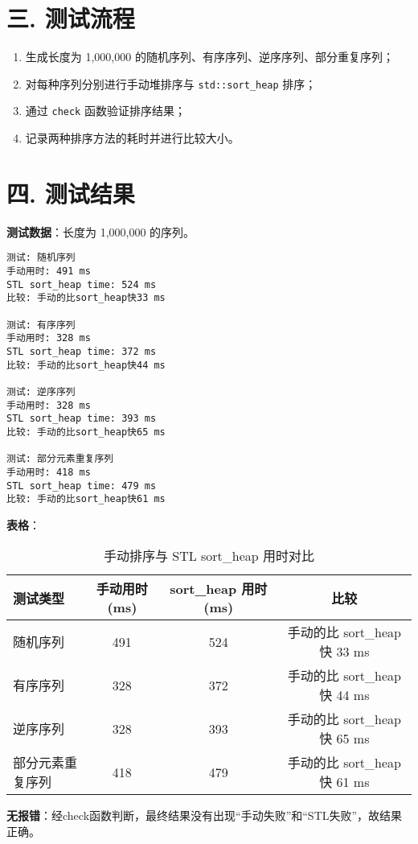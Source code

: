 \documentclass[a4paper]{article}
\begin{document}
\section*{三. 测试流程}

\begin{enumerate}
    \item 生成长度为 1,000,000 的随机序列、有序序列、逆序序列、部分重复序列；
    \item 对每种序列分别进行手动堆排序与 \texttt{std::sort\_heap} 排序；
    \item 通过 \texttt{check} 函数验证排序结果；
    \item 记录两种排序方法的耗时并进行比较大小。
\end{enumerate}

\section*{四. 测试结果}

\noindent \textbf{测试数据}：长度为 1,000,000 的序列。

\begin{verbatim}
测试: 随机序列
手动用时: 491 ms
STL sort_heap time: 524 ms
比较: 手动的比sort_heap快33 ms

测试: 有序序列
手动用时: 328 ms
STL sort_heap time: 372 ms
比较: 手动的比sort_heap快44 ms

测试: 逆序序列
手动用时: 328 ms
STL sort_heap time: 393 ms
比较: 手动的比sort_heap快65 ms

测试: 部分元素重复序列
手动用时: 418 ms
STL sort_heap time: 479 ms
比较: 手动的比sort_heap快61 ms
\end{verbatim}

\textbf{表格}：
\begin{table}[h!]
\centering
\begin{tabular}{@{}lccc@{}}
\toprule
测试类型         & 手动用时 (ms) & sort\_heap 用时 (ms) & 比较 \\ \midrule
随机序列         & 491           & 524                      & 手动的比 sort\_heap 快 33 ms \\
有序序列         & 328           & 372                      & 手动的比 sort\_heap 快 44 ms \\
逆序序列         & 328           & 393                      & 手动的比 sort\_heap 快 65 ms \\
部分元素重复序列 & 418           & 479                      & 手动的比 sort\_heap 快 61 ms \\ \bottomrule
\end{tabular}
\caption{手动排序与 STL sort\_heap 用时对比}
\label{tab:performance_comparison}
\end{table}

\textbf{无报错}：经check函数判断，最终结果没有出现“手动失败”和“STL失败”，故结果正确。
\end{document}
